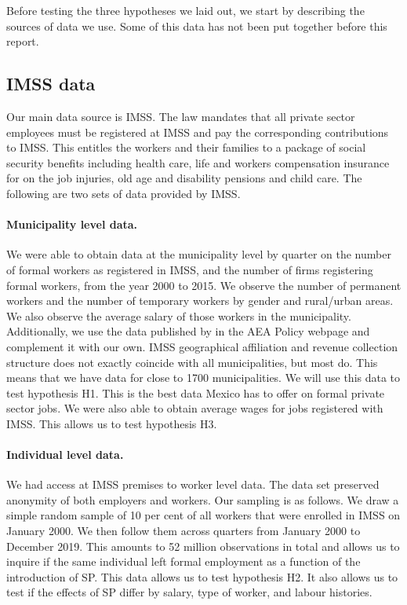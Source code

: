 \documentclass[oneside,11pt]{article}
\begin{document}
Before testing the three hypotheses we laid out, we start by describing the sources of data we use. Some of this data has not been put together before this report. 

\subsection{IMSS data}

Our main data source is IMSS. The law mandates that all private sector employees must be registered at IMSS and pay the corresponding contributions to IMSS. This entitles the workers and their families to a package of social security benefits including health care, life and workers compensation insurance for on the job injuries, old age and disability pensions and child care. The following are two sets of data provided by IMSS.

\paragraph{Municipality level data.} We were able to obtain data at the municipality level by quarter on the number of formal workers as registered in IMSS, and the number of firms registering formal workers, from the year 2000 to 2015. We observe the number of permanent workers and the number of temporary workers by gender and rural/urban areas. We also observe the average salary of those workers in the municipality. Additionally, we use the data published by \cite{Campos} in the AEA Policy webpage and complement it with our own. IMSS geographical affiliation and revenue collection structure does not exactly coincide with all municipalities, but most do. This means that we have data for close to 1700 municipalities. We will use this data to test hypothesis H1. This is the best data Mexico has to offer on formal private sector jobs. We were also able to obtain average wages for jobs registered with IMSS. This allows us to test hypothesis H3.

\paragraph{Individual level data.} We had access at IMSS premises to worker level data. The data set preserved anonymity of both employers and workers. Our sampling is as follows. We draw a simple random sample of 10 per cent of all workers that were enrolled in IMSS on January 2000. We then follow them across quarters from January 2000 to December 2019. This amounts to 52 million observations in total and allows us to inquire if the same individual left formal employment as a function of the introduction of SP. This data allows us to test hypothesis H2. It also allows us to test if the effects of SP differ by salary, type of worker, and labour histories. 
\end{document}
